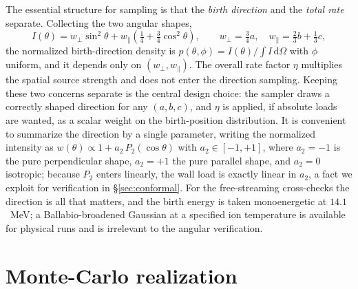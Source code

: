 \documentclass[11pt]{article}
\newcommand{\dd}{\,\mathrm{d}}
\begin{document}
The essential structure for sampling is that the \emph{birth direction} and the
\emph{total rate} separate. Collecting the two angular shapes,
\begin{equation}
I(\theta)=w_\perp\sin^2\theta+w_\parallel\!\left(\tfrac14+\tfrac34\cos^2\theta\right),
\qquad w_\perp=\tfrac34 a,\quad w_\parallel=\tfrac23 b+\tfrac13 c,
\label{eq:I}
\end{equation}
the normalized birth-direction density is $p(\theta,\phi)=I(\theta)/\!\int I\dd\Omega$ with
$\phi$ uniform, and it depends only on $(w_\perp,w_\parallel)$. The overall rate factor
$\eta$ multiplies the spatial source strength and does not enter the direction sampling.
Keeping these two concerns separate is the central design choice: the sampler draws a
correctly shaped direction for any $(a,b,c)$, and $\eta$ is applied, if absolute loads are
wanted, as a scalar weight on the birth-position distribution. It is convenient to
summarize the direction by a single parameter, writing the normalized intensity as
$w(\theta)\propto1+a_2\,P_2(\cos\theta)$ with $a_2\in[-1,+1]$, where $a_2=-1$ is the pure
perpendicular shape, $a_2=+1$ the pure parallel shape, and $a_2=0$ isotropic; because $P_2$
enters linearly, the wall load is exactly linear in $a_2$, a fact we exploit for
verification in \S\ref{sec:conformal}. For the free-streaming cross-checks the direction is
all that matters, and the birth energy is taken monoenergetic at $14.1$~MeV; a
Ballabio-broadened Gaussian at a specified ion temperature is available for physical runs
and is irrelevant to the angular verification.

\section{Monte-Carlo realization}
\label{sec:mc}
\end{document}
